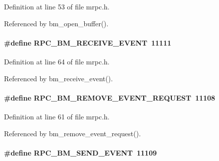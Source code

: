 \begin{DoxyItemize}
\item 
\end{DoxyItemize}

Definition at line 53 of file mrpc.h.

Referenced by bm\_\-open\_\-buffer().
\paragraph[{RPC\_\-BM\_\-RECEIVE\_\-EVENT}]{\setlength{\rightskip}{0pt plus 5cm}\#define RPC\_\-BM\_\-RECEIVE\_\-EVENT~11111}\hfill\label{group__mrpcdefineh_gad0d0e115e7026f808f8df526ff5c77ee}

\begin{DoxyItemize}
\item 
\end{DoxyItemize}

Definition at line 64 of file mrpc.h.

Referenced by bm\_\-receive\_\-event().
\paragraph[{RPC\_\-BM\_\-REMOVE\_\-EVENT\_\-REQUEST}]{\setlength{\rightskip}{0pt plus 5cm}\#define RPC\_\-BM\_\-REMOVE\_\-EVENT\_\-REQUEST~11108}\hfill\label{group__mrpcdefineh_ga3955d6212a5b08beaae12ee07aecd088}

\begin{DoxyItemize}
\item 
\end{DoxyItemize}

Definition at line 61 of file mrpc.h.

Referenced by bm\_\-remove\_\-event\_\-request().
\paragraph[{RPC\_\-BM\_\-SEND\_\-EVENT}]{\setlength{\rightskip}{0pt plus 5cm}\#define RPC\_\-BM\_\-SEND\_\-EVENT~11109}\hfill\label{group__mrpcdefineh_ga1e44640630aa4a9a60e344cde968587b}

